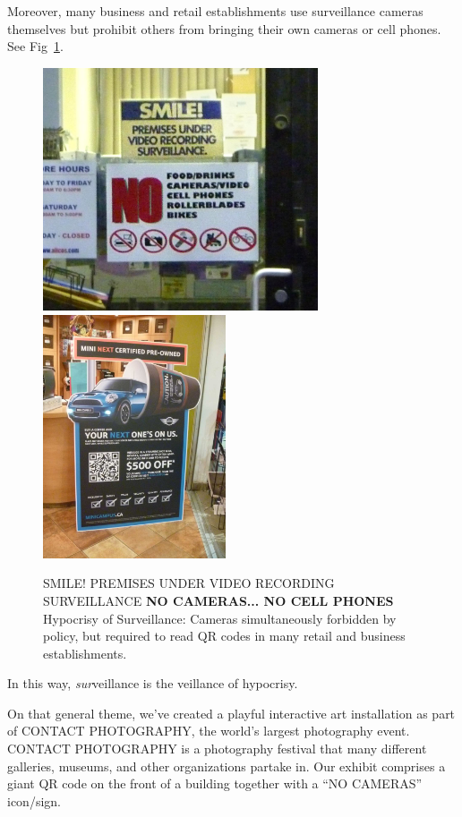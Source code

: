 Moreover, many business and retail establishments use
surveillance cameras themselves but prohibit others from
bringing their own cameras or cell phones.  See Fig~\ref{surveillancehypocrisy}.
\begin{figure}
  \centering
  \includegraphics[height=2.83in]{ch5/figs/signoalicosproc2lowq.jpg}
  \includegraphics[height=2.83in]{ch5/figs/advertisementQR_lowres.jpg}
    \caption{SMILE! 
             PREMISES UNDER VIDEO RECORDING SURVEILLANCE
             {\bf NO CAMERAS... NO CELL PHONES}
             Hypocrisy of Surveillance: Cameras simultaneously forbidden
             by policy, but
             required to read QR codes in many retail and business
             establishments.
            }
    \label{surveillancehypocrisy}
\end{figure}
In this way, {\em sur}veillance is the veillance of hypocrisy.

On that general theme, we've created a playful interactive art installation
as part of CONTACT PHOTOGRAPHY, the world's largest photography event.
CONTACT PHOTOGRAPHY is a photography festival that many different galleries,
museums, and other organizations partake in.
Our exhibit comprises a giant QR code on the front of a building
together with a ``NO CAMERAS'' icon/sign.

